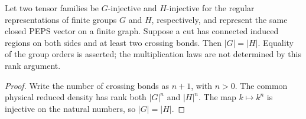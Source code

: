 \begin{lemma}%
    \label{thm:peps_regular_group_order_rigidity}
    \leanok
    Let two tensor families be $G$-injective and $H$-injective for
    the regular representations of finite groups $G$ and $H$,
    respectively, and represent the same closed PEPS vector on
    a finite graph. Suppose a cut has connected induced regions on
    both sides and at least two crossing bonds. Then $|G|=|H|$.
    Equality of the group orders is asserted; the multiplication
    laws are not determined by this rank argument.
\end{lemma}

\begin{proof}\leanok
    Write the number of crossing bonds as $n+1$, with $n>0$.
    The common physical reduced density has rank both $|G|^n$ and
    $|H|^n$. The map $k\mapsto k^n$ is injective on the natural
    numbers, so $|G|=|H|$.
\end{proof}
